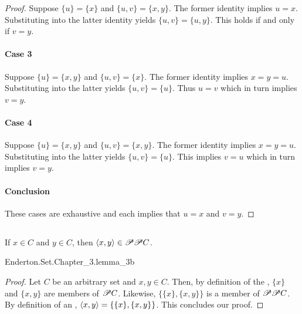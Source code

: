 \documentclass{report}
\begin{document}
\begin{proof}
        Suppose $\{u\} = \{x\}$ and $\{u, v\} = \{x, y\}$.
        The former identity implies $u = x$.
        Substituting into the latter identity yields $\{u, v\} = \{u, y\}$.
        This holds if and only if $v = y$.

      \paragraph{Case 3}%

        Suppose $\{u\} = \{x, y\}$ and $\{u, v\} = \{x\}$.
        The former identity implies $x = y = u$.
        Substituting into the latter yields $\{u, v\} = \{u\}$.
        Thus $u = v$ which in turn implies $v = y$.

      \paragraph{Case 4}%
        Suppose $\{u\} = \{x, y\}$ and $\{u, v\} = \{x, y\}$.
        The former identity implies $x = y = u$.
        Substituting into the latter yields $\{u, v\} = \{u\}$.
        This implies $v = u$ which in turn implies $v = y$.

      \paragraph{Conclusion}%

        These cases are exhaustive and each implies that $u = x$ and $v = y$.

  \end{proof}

\subsection{}%

  \begin{lemma}[3B]
    If $x \in C$ and $y \in C$, then $\left< x, y \right> \in \mathscr{P}\mathscr{P}C$.
  \end{lemma}

    {Enderton.Set.Chapter\_3.lemma\_3b}

  \begin{proof}
    Let $C$ be an arbitrary set and $x, y \in C$.
    Then, by definition of the ,
      $\{x\}$ and $\{x, y\}$ are members of $\mathscr{P}C$.
    Likewise, $\{\{x\}, \{x, y\}\}$ is a member of $\mathscr{P}\mathscr{P}C$.
    By definition of an ,
      $\left< x, y \right> = \{\{x\}, \{x, y\}\}$.
    This concludes our proof.
  \end{proof}
\end{document}
